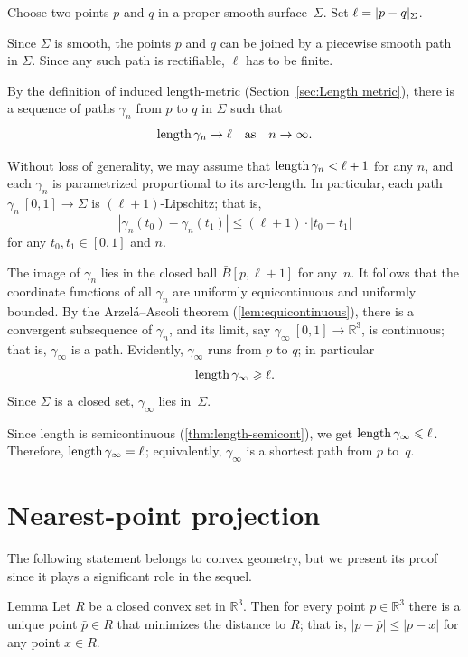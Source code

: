 {
Choose two points $p$ and $q$ in a proper smooth surface~$\Sigma$.
Set $\ell=\dist{p}{q}\Sigma$.

Since $\Sigma$ is smooth, the points $p$ and $q$ can be joined by a piecewise smooth path in $\Sigma$.
Since any such path is rectifiable, $\ell$ has to be finite.

By the definition of induced length-metric (Section~\ref{sec:Length metric}),
there is a sequence of paths $\gamma_n$ from $p$ to $q$ in $\Sigma$ such that
\[\mathop{\rm length}\nolimits\gamma_n\to \ell\quad\text{as}\quad n\to \infty.\]

Without loss of generality, we may assume that $\mathop{\rm length}\nolimits\gamma_n<\ell+1$ for any $n$, and each $\gamma_n$ is parametrized proportional to its arc-length.
In particular, each path $\gamma_n\:[0,1]\to\Sigma$ is $(\ell+1)$-Lipschitz; 
that is,
\[|\gamma_n(t_0)-\gamma_n(t_1)|\le (\ell+1)\cdot|t_0-t_1|\]
for any $t_0,t_1\in[0,1]$ and $n$.

The image of $\gamma_n$ lies in the closed ball $\bar B[p,\ell+1]$ for any~$n$.
It follows that the coordinate functions of all $\gamma_n$ are uniformly equicontinuous and uniformly bounded.
By the Arzel\'{a}--Ascoli theorem (\ref{lem:equicontinuous}),
 there is a convergent subsequence of $\gamma_n$, and its limit, say $\gamma_\infty\:[0,1]\to\mathbb{R}^3$, is continuous;
that is, $\gamma_\infty$ is a path.
Evidently, $\gamma_\infty$ runs from $p$ to $q$;
in particular
\[\mathop{\rm length}\nolimits\gamma_\infty\geqslant \ell.\]
Since $\Sigma$ is a closed set, $\gamma_\infty$ lies in~$\Sigma$.

Since length is semicontinuous (\ref{thm:length-semicont}), we get $\mathop{\rm length}\nolimits\gamma_\infty\leqslant \ell$.
Therefore, $\length\gamma_\infty\z= \ell$; equivalently, $\gamma_\infty$ is a shortest path from $p$ to~$q$.
\qeds

\section{Nearest-point projection}

The following statement belongs to convex geometry,
but we present its proof since it plays a significant role in the sequel.

\begin{thm}{Lemma}\label{lem:nearest-point-projection}
Let $R$ be a closed convex set in $\mathbb{R}^3$.
Then for every point $p\in\mathbb{R}^3$ there is a unique point $\bar p\in R$ that minimizes the distance to $R$;
that is, $|p-\bar p|\le |p-x|$ for any point $x\in R$.


\end{thm}}
